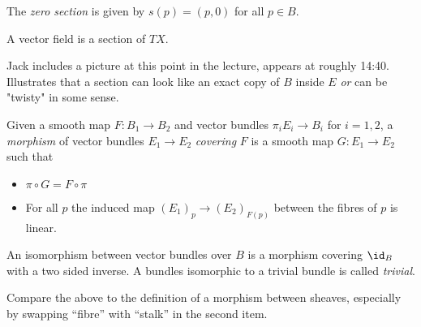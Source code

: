 \begin{example}\label{example:lec2.11}
	The \emph{zero section} is given by $s(p) = (p,0)$ for all $p \in B$.
\end{example}

\begin{example}\label{example:lec2.12}
	A vector field is a section of $TX$.
\end{example}

Jack includes a picture at this point in the lecture, appears at roughly 14:40. Illustrates that a section can look like an exact copy of $B$ inside $E$ \emph{or} can be "twisty" in some sense.

\begin{defn}\label{defn:morphism-vec-bundles}
	Given a smooth map $F:B_1\to B_2$ and vector bundles $\pi_iE_i \to B_i$ for $i = 1,2$, a \emph{morphism} of vector bundles $E_1 \to E_2$ \emph{covering} $F$ is a smooth map $G:E_1\to E_2$ such that
	\begin{itemize}
		\item $\pi\circ G = F\circ \pi$
		\item For all $p$ the induced map $(E_1)_p \to (E_2)_{F(p)}$ between the fibres of $p$ is linear.
	\end{itemize}
	An isomorphism between vector bundles over $B$ is a morphism covering $\id_B$ with a two sided inverse. A bundles isomorphic to a trivial bundle is called \emph{trivial}.
\end{defn}
Compare the above to the definition of a morphism between sheaves, especially by swapping ``fibre'' with ``stalk'' in the second item.

